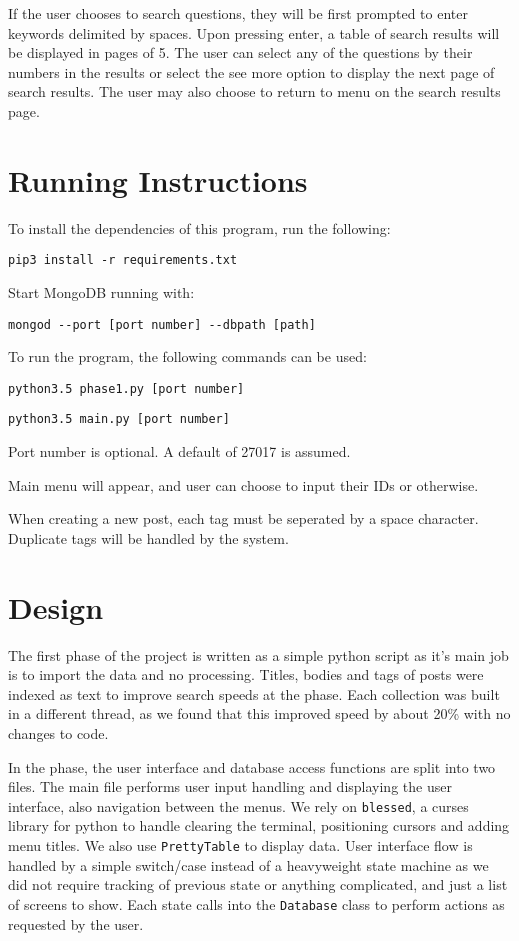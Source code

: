 \documentclass{article}
\begin{document}
If the user chooses to search questions, they will be first prompted to enter keywords delimited by spaces. Upon pressing enter, a table of search results will be displayed in pages of 5. The user can select any of the questions by their numbers in the results or select the see more option to display the next page of search results. The user may also choose to return to menu on the search results page.

\section{Running Instructions}

To install the dependencies of this program, run the following:

\verb|pip3 install -r requirements.txt|

Start MongoDB running with:

\verb|mongod --port [port number] --dbpath [path]|

To run the program, the following commands can be used:

\verb|python3.5 phase1.py [port number]|

\verb|python3.5 main.py [port number]|

Port number is optional. A default of 27017 is assumed.

Main menu will appear, and user can choose to input their IDs or otherwise.

When creating a new post, each tag must be seperated by a space character. Duplicate tags will be handled by the system.

\section{Design}

The first phase of the project is written as a simple python script as it's main job is to import the data and no processing. Titles, bodies and tags of posts were indexed as text to improve search speeds at the  phase. Each collection was built in a different thread, as we found that this improved speed by about 20\% with no changes to code.

In the  phase, the user interface and database access functions are split into two files. The main file performs user input handling and displaying the user interface, also navigation between the menus. We rely on \verb|blessed|, a curses library for python to handle clearing the terminal, positioning cursors and adding menu titles. We also use \verb|PrettyTable| to display data. User interface flow is handled by a simple switch/case instead of a heavyweight state machine as we did not require tracking of previous state or anything complicated, and just a list of screens to show. Each state calls into the \verb|Database| class to perform actions as requested by the user.
\end{document}
